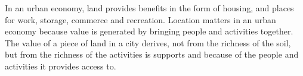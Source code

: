
In an urban economy, land provides benefits in the form of housing, and places for work, storage, commerce and recreation. Location matters in an urban economy because value is generated by bringing people and activities together. The value of a piece of land in a city derives, not from the richness of the soil, but from the richness of the activities is supports and because of the people and activities it provides access to.   

